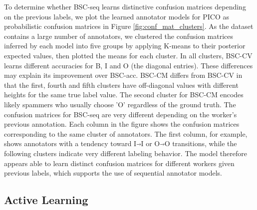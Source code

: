 To determine whether BSC-seq learns distinctive confusion matrices depending on the previous labels,
we plot the learned annotator models for
PICO as probabilistic confusion matrices in Figure \ref{fig:conf_mat_clusters}.
As the dataset contains a large number of annotators, we clustered 
the confusion matrices inferred by each model
into five groups by applying K-means to their posterior expected values,
then plotted the means for each cluster.
In all clusters, BSC-CV learns different accuracies for B, I and O (the diagonal entries). 
These differences may explain its
improvement over BSC-acc.
BSC-CM differs from BSC-CV in that %
the first, fourth and fifth clusters 
have off-diagonal values with different heights for the same true label value.
 The second 
cluster for BSC-CM encodes likely spammers who usually choose 'O' regardless of the 
ground truth. 
The confusion matrices for BSC-seq are
very different depending on the worker's previous annotation. 
Each column in the figure shows the confusion matrices corresponding to the same cluster of annotators. 
The first column, for example, shows
annotators with a tendency toward I$\Arrow{0.2cm}$I or O$\Arrow{0.2cm}$O transitions, while the following clusters 
indicate very different labeling behavior. The model therefore appears able to learn
distinct confusion matrices for different workers given previous labels, which supports the use of sequential
annotator models.

 \subsection{Active Learning}

